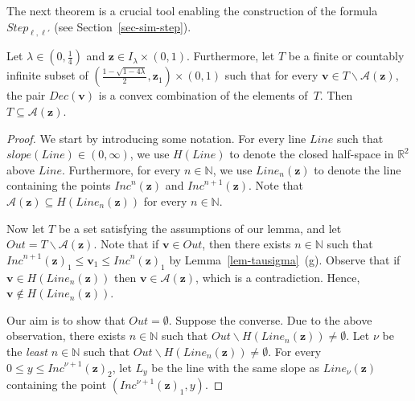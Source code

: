 \documentclass[a4paper,UKenglish,cleveref, autoref, thm-restate]{lipics-v2021}
\newcommand{\N}{\mathbb{N}}
\newcommand{\R}{\mathbb{R}}
\newcommand{\Step}{\mathit{Step}}
\newcommand{\Line}{\mathit{Line}}
\newcommand{\Area}{\mathcal{A}}
\newcommand{\Out}{\mathit{Out}}
\newcommand{\slope}{\mathit{slope}}
\newcommand{\INC}{\mathit{Inc}}
\newcommand{\DEC}{\mathit{Dec}}
\renewcommand{\vec}[1]{\pmb{#1}}
\begin{document}
The next theorem is a crucial tool enabling the construction of the formula $\Step_{\ell,\ell'}$ (see Section~\ref{sec-sim-step}). 

\begin{theorem}
    \label{thm-area}
    Let $\lambda \in (0,\frac{1}{4})$ and $\vec{z} \in I_\lambda \times (0,1)$.
    Furthermore, let $T$ be a finite or countably infinite subset of $(\frac{1-\sqrt{1-4\lambda}}{2},\vec{z}_1) \times (0,1)$ such that for every $\vec{v} \in T \smallsetminus \Area(\vec{z})$, the pair $\DEC(\vec{v})$ is a convex combination of the elements of~$T$. Then $T \subseteq \Area(\vec{z})$.
\end{theorem}
\begin{proof}
   We start by introducing some notation. For every line $\Line$ such that $\slope(\Line) \in (0,\infty)$, we use $H(\Line)$ to denote the closed half-space in $\R^2$ above $\Line$. Furthermore, for every $n\in \N$, we use $\Line_n(\vec{z})$ to denote the line containing the points $\INC^n(\vec{z})$ and $\INC^{n+1}(\vec{z})$. Note that $\Area(\vec{z}) \subseteq H(\Line_n(\vec{z}))$ for every $n \in \N$.
   
   Now let $T$ be a set satisfying the assumptions of our lemma, and  let $\Out = T \smallsetminus \Area(\vec{z})$. Note that if $\vec{v} \in \Out$, then there exists $n \in \N$ such that $\INC^{n+1}(\vec{z})_1 \leq \vec{v}_1 \leq \INC^{n}(\vec{z})_1$ by Lemma~\ref{lem-tausigma}~(g). Observe that if $\vec{v} \in H(\Line_n(\vec{z}))$ then $\vec{v} \in \Area(\vec{z})$, which is a contradiction. Hence, $\vec{v} \not\in H(\Line_n(\vec{z}))$.
   
   Our aim is to show that $\Out = \emptyset$. Suppose the converse. Due to the above observation, there exists $n \in \N$ such that $\Out \smallsetminus H(\Line_n(\vec{z})) \neq \emptyset$.
   Let $\nu$ be the \emph{least} \mbox{$n \in \N$} such that $\Out \smallsetminus H(\Line_n(\vec{z})) \neq \emptyset$. For every \mbox{$0 \leq y \leq \INC^{\nu+1}(\vec{z})_2$}, let $L_y$ be the line with the same slope as $\Line_{\nu}(\vec{z})$ containing the point $(\INC^{\nu+1}(\vec{z})_1, y)$. 


\end{proof}
\end{document}
